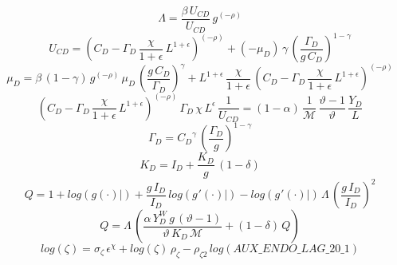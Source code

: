 \documentclass[10pt,a4paper]{article}
\begin{document}
\begin{dmath}
{\Lambda}=\frac{\beta\, {U_{CD}}}{{U_{CD}}}\, {g}^{\left(-\rho\right)}
\end{dmath}
\begin{dmath}
{U_{CD}}=\left({C_D}-{\Gamma_D}\, \frac{\chi}{1+\epsilon}\, {L}^{1+\epsilon}\right)^{\left(-\rho\right)}+\left(-{{\mu}_{D}}\right)\, \gamma\, \left(\frac{{\Gamma_D}}{{g}\, {C_D}}\right)^{1-\gamma}
\end{dmath}
\begin{dmath}
{{\mu}_{D}}=\beta\, \left(1-\gamma\right)\, {g}^{\left(-\rho\right)}\, {{\mu}_{D}}\, \left(\frac{{g}\, {C_D}}{{\Gamma_D}}\right)^{\gamma}+{L}^{1+\epsilon}\, \frac{\chi}{1+\epsilon}\, \left({C_D}-{\Gamma_D}\, \frac{\chi}{1+\epsilon}\, {L}^{1+\epsilon}\right)^{\left(-\rho\right)}
\end{dmath}
\begin{dmath}
\left({C_D}-{\Gamma_D}\, \frac{\chi}{1+\epsilon}\, {L}^{1+\epsilon}\right)^{\left(-\rho\right)}\, {\Gamma_D}\, \chi\, {L}^{\epsilon}\, \frac{1}{{U_{CD}}}=\left(1-\alpha\right)\, \frac{1}{\mathcal{M}}\, \frac{\vartheta-1}{\vartheta}\, \frac{{Y_D}}{{L}}
\end{dmath}
\begin{dmath}
{\Gamma_D}={C_D}^{\gamma}\, \left(\frac{{\Gamma_D}}{{g}}\right)^{1-\gamma}
\end{dmath}
\begin{dmath}
{K_D}={I_D}+\frac{{K_D}}{{g}}\, \left(1-\delta\right)
\end{dmath}
\begin{dmath}
{Q}=1+log\left({\left.       g\left( \cdot \right)            \right|}\right)+\frac{{g}\, {I_D}}{{I_D}}\, log\left({\left.       g^‎{\prime}\left( \cdot \right)   \right|}\right)-log\left({\left.       g^‎{\prime}\left( \cdot \right)   \right|}\right)\, {\Lambda}\, \left(\frac{{g}\, {I_D}}{{I_D}}\right)^{2}
\end{dmath}
\begin{dmath}
{Q}={\Lambda}\, \left(\frac{\alpha\, {Y^W_D}\, {g}\, \left(\vartheta-1\right)}{\vartheta\, {K_D}\, \mathcal{M}}+\left(1-\delta\right)\, {Q}\right)
\end{dmath}
\begin{dmath}
log\left({\zeta}\right)={\sigma}_{\zeta}\, {\epsilon}^{\chi}+log\left({\zeta}\right)\, {\rho}_{\zeta}-{\rho}_{\zeta2}\, log\left(AUX\_ENDO\_LAG\_20\_1\right)
\end{dmath}
\end{document}
